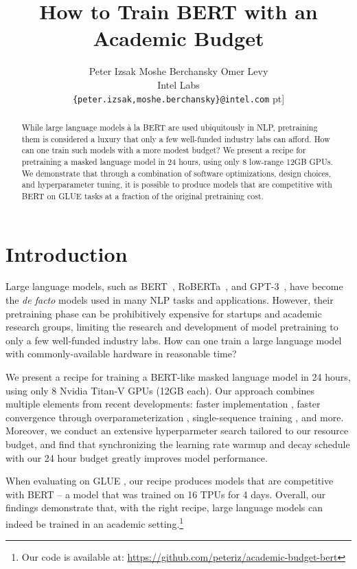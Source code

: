 \documentclass[11pt]{article}
\title{How to Train BERT with an Academic Budget}
\author{Peter Izsak \quad Moshe Berchansky \quad Omer Levy \\
 Intel Labs \\
{\tt \{peter.izsak,moshe.berchansky\}@intel.com} \4pt]
}
\newcommand{\bertbase}{BERT }
\begin{document}
\maketitle

\begin{abstract}
While large language models à la BERT are used ubiquitously in NLP, pretraining them is considered a luxury that only a few well-funded industry labs can afford.
How can one train such models with a more modest budget?
We present a recipe for pretraining a masked language model in 24 hours, using only 8 low-range 12GB GPUs.
We demonstrate that through a combination of software optimizations, design choices, and hyperparameter tuning, it is possible to produce models that are competitive with \bertbase on GLUE tasks at a fraction of the original pretraining cost.










\end{abstract} \section{Introduction} \label{sec:intro}

Large language models, such as BERT~\cite{devlin-etal-2019-bert}, RoBERTa~\cite{Liu2019RoBERTaAR}, and GPT-3~\cite{gpt3}, have become the \textit{de facto} models used in many NLP tasks and applications.
However, their pretraining phase can be prohibitively expensive for startups and academic research groups, limiting the research and development of model pretraining to only a few well-funded industry labs.
How can one train a large language model with commonly-available hardware in reasonable time?

We present a recipe for training a BERT-like masked language model in 24 hours, using only 8 Nvidia Titan-V GPUs (12GB each).
Our approach combines multiple elements from recent developments: faster implementation \cite{deepspeed}, faster convergence through overparameterization \cite{Li2020TrainLT}, single-sequence training \cite{joshi-etal-2020-spanbert, Liu2019RoBERTaAR}, and more.
Moreover, we conduct an extensive hyperparmeter search tailored to our resource budget, and find that synchronizing the learning rate warmup and decay schedule with our 24 hour budget greatly improves model performance.

When evaluating on GLUE \cite{wang-etal-2018-glue}, our recipe produces models that are competitive with \bertbase{} -- a model that was trained on 16 TPUs for 4 days.
Overall, our findings demonstrate that, with the right recipe, large language models can indeed be trained in an academic setting.\footnote{Our code is available at: \url{https://github.com/peteriz/academic-budget-bert}}
\end{document}
